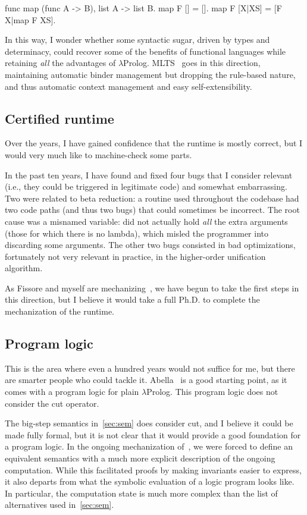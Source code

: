 \documentclass{these-ISSS}
\newenvironment{elpicode}
  {\VerbatimEnvironment\begin{elpibox}\begin{xelpicode}}{\end{xelpicode}
\end{elpibox}}
\begin{document}
\begin{elpicode}
func map (func A -> B), list A -> list B.
map F [] = [].
map F [X|XS] = [F X|map F XS].
\end{elpicode}

\noindent In this way, I
wonder whether some syntactic sugar, driven by types and determinacy, could
recover some of the benefits of functional languages while retaining \emph{all}
the advantages of $\lambda$Prolog. MLTS~\cite{mlts} goes in this direction,
maintaining automatic binder management but dropping the rule-based nature, and
thus automatic context management and easy self-extensibility.

\subsection{Certified runtime}

Over the years, I have gained confidence that the runtime is mostly correct,
but I would very much like to machine-check some parts.

In the past ten years, I have found and fixed four bugs that I consider
relevant (i.e., they could be triggered in legitimate code) and somewhat
embarrassing. Two were related to beta reduction: a routine used throughout the
codebase had two code paths (and thus two bugs) that could sometimes be
incorrect. The root cause was a misnamed variable:  did not
actually hold \emph{all} the extra arguments (those for which there is no
lambda), which misled the programmer into discarding some arguments. The other
two bugs consisted in bad optimizations, fortunately not very relevant in practice,
in the higher-order unification algorithm.

As Fissore and myself are mechanizing~\cite{elpidet}, we have begun to take the first steps in
this direction, but I believe it would take a full Ph.D. to complete the
mechanization of the runtime.

\subsection{Program logic}

This is the area where even a hundred years would not suffice for me, but there
are smarter people who could tackle it. Abella~\cite{abella} is a good starting
point, as it comes with a program logic for plain $\lambda$Prolog. This program
logic does not consider the cut operator. 

The big-step semantics
in~\cref{sec:sem} does consider cut, and I believe it could be made fully
formal, but it is not clear that it would provide a good foundation for a
program logic. In the ongoing mechanization of~\cite{elpidet}, we were forced
to define an equivalent semantics with a much more explicit description of the
ongoing computation. While this facilitated proofs by making invariants easier
to express, it also departs from what the symbolic evaluation of a logic
program looks like. In particular, the computation state is much more complex
than the list of alternatives used in~\cref{sec:sem}.
\end{document}
